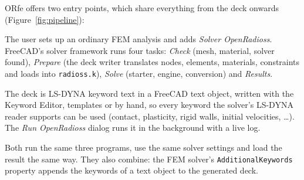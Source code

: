 \documentclass[11pt,a4paper]{article}
\begin{document}
ORfe offers two entry points, which share everything from the deck onwards
(Figure~\ref{fig:pipeline}):
\begin{description}[font=\sffamily\bfseries,leftmargin=1em]
  \item[FEM workbench] The user sets up an ordinary FEM analysis and adds \emph{Solver OpenRadioss}.
        FreeCAD's solver framework runs four tasks: \emph{Check} (mesh, material, solver found),
        \emph{Prepare} (the deck writer translates nodes, elements, materials, constraints and
        loads into \texttt{radioss.k}), \emph{Solve} (starter, engine, conversion) and \emph{Results}.
  \item[Keyword deck] The deck is LS-DYNA keyword text in a FreeCAD text object, written with the
        Keyword Editor, templates or by hand, so every keyword the solver's LS-DYNA reader supports
        can be used (contact, plasticity, rigid walls, initial velocities, \dots). The \emph{Run
        OpenRadioss} dialog runs it in the background with a live log.
\end{description}
Both run the same three programs, use the same solver settings and load the result the same way.
They also combine: the FEM solver's \texttt{AdditionalKeywords} property appends the keywords of a
text object to the generated deck.
\end{document}
